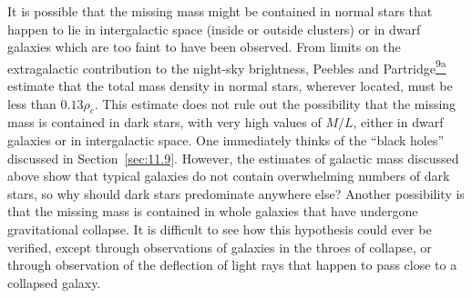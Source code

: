 It is possible that the missing mass might be contained in normal stars that
happen to lie in intergalactic space (inside or outside clusters) or in dwarf
galaxies which are too faint to have been observed. From limits on the
extragalactic contribution to the night-sky brightness, Peebles and
Partridge\hyperref[ch15-ref-9a]{\textsuperscript{9a}} estimate that the total
mass density in normal stars, wherever located, must be less than
\(0.13\rho_c\). This estimate does not rule out the possibility that the
missing mass is contained in dark stars, with very high values of \(M/L\),
either in dwarf galaxies or in intergalactic space. One immediately thinks of
the ``black holes'' discussed in Section~\ref{sec:11.9}. However, the estimates
of galactic mass discussed above show that typical galaxies do not contain
overwhelming numbers of dark stars, so why should dark stars predominate
anywhere else? Another possibility is that the missing mass is contained in
whole galaxies that have undergone gravitational collapse. It is difficult to
see how this hypothesis could ever be verified, except through observations of
galaxies in the throes of collapse, or through observation of the deflection of
light rays that happen to pass close to a collapsed galaxy.

